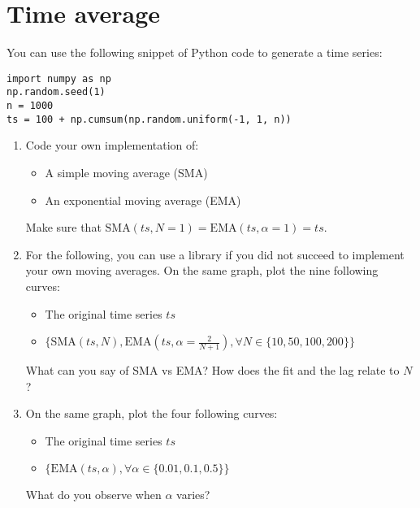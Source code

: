 \section{Time average}
You can use the following snippet of Python code to generate a time series:
\begin{verbatim}
import numpy as np
np.random.seed(1)
n = 1000
ts = 100 + np.cumsum(np.random.uniform(-1, 1, n))
\end{verbatim}
\begin{enumerate}
    \item Code your own implementation of:
        \begin{itemize}
            \item A simple moving average (SMA)
            \item An exponential moving average (EMA)
        \end{itemize}
        Make sure that $\mathrm{SMA}(ts, N=1) = \mathrm{EMA}(ts, \alpha=1) = ts$.
    \item For the following, you can use a library if you did not succeed to implement your own moving averages. On the same graph, plot the nine following curves:
        \begin{itemize}
            \item The original time series $ts$ 
            \item $\{ \mathrm{SMA}(ts, N), \mathrm{EMA}(ts, \alpha=\frac{2}{N+1}), \forall N \in \{10, 50, 100, 200\} \} $
        \end{itemize}
    What can you say of SMA vs EMA? How does the fit and the lag relate to $N$?  
    \item On the same graph, plot the four following curves:
        \begin{itemize}
            \item The original time series $ts$ 
            \item $\{ \mathrm{EMA}(ts, \alpha), \forall \alpha \in \{0.01, 0.1, 0.5 \} \} $
        \end{itemize}
        What do you observe when $\alpha$ varies?
\end{enumerate}